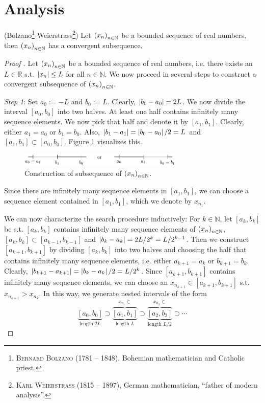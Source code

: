 \section{Analysis}

\begin{theorem}(Bolzano\footnote{\textsc{Bernard Bolzano} (1781 -- 1848), Bohemian mathematician and Catholic priest.}-Weierstrass\footnote{\textsc{Karl Weierstrass} (1815 -- 1897), German mathematician, \enquote{father of modern analysis}.})\label{thrm:bolzano_weierstrass}
	Let $\seq[x_n]$ be a bounded sequence of real numbers, then $\seq[x_n]$ has a convergent subsequence.
\end{theorem}

\begin{proof}[Proof \cite{src:bolzano_weierstrass}]
	Let $\seq[x_n]$ be a bounded sequence of real numbers, i.e. there exists an $L\in\mathbb R$ s.t. $\abs{x_n}\leq L$ for all $n\in\mathbb N$. We now proceed in several steps to construct a convergent subsequence of $\seq[x_n]$.
	
	\textit{Step 1}: Set $a_0 := -L$ and $b_0 := L$. Clearly, $\abs{b_0 - a_0} = 2L$. We now divide the interval $[a_0, b_0]$ into two halves. At least one half contains infinitely many sequence elements. We now pick that half and denote it by $[a_1, b_1]$. Clearly, either $a_1 = a_0$ or $b_1 = b_0$. Also, $\abs{b_1 - a_1} = \abs{b_0 - a_0}/2 = L$ and $[a_1, b_1]\subset [a_0, b_0]$. Figure \ref{fig:bolzano_weierstrass} visualizes this. 
	\begin{figure}[h!]
		\centering
		\includegraphics[width=0.7\textwidth]{Figures/bolzano_weierstrass_interval_construction.pdf}
		\caption{Construction of subsequence of $\seq[x_n]$.}
		\label{fig:bolzano_weierstrass}
	\end{figure}
	Since there are infinitely many sequence elements in $[a_1, b_1]$, we can choose a sequence element contained in $[a_1, b_1]$, which we denote by $x_{n_1}$. 
	
	We can now characterize the search procedure inductively: For $k\in\mathbb N$, let $[a_k, b_k]$ be s.t. $[a_k, b_k]$ contains infinitely many sequence elements of $\seq[x_n]$, $[a_k, b_k]\subset [a_{k-1}, b_{k-1}]$ and $\abs{b_k - a_k} = 2L/2^k = L/2^{k-1}$. Then we construct $[a_{k+1}, b_{k+1}]$ by dividing $[a_k, b_k]$ into two halves and choosing the half that contains infinitely many sequence elements, i.e. either $a_{k+1} = a_k$ or $b_{k + 1} = b_{k}$. Clearly, $\abs{b_{k+1} - a_{k+1}} = \abs{b_k - a_k}/2 = L/2^{k}$. Since $[a_{k+1}, b_{k+1}]$ contains infinitely many sequence elements, we can choose an $x_{n_{k+1}}\in [a_{k+1}, b_{k+1}]$ s.t. $x_{n_{k+1}} > x_{n_k}$. In this way, we generate nested intervals of the form 
	\[
		\underbrace{[a_0, b_0]}_{\text{length } 2L} \supset \overbrace{\underbrace{[a_1, b_1]}}^{x_{n_1}\in}_{\text{length } L} \supset \overbrace{\underbrace{[a_2, b_2]}}^{x_{n_2} \in }_{\text{length }L/2} \supset \cdots		
	\]
	

\end{proof}
